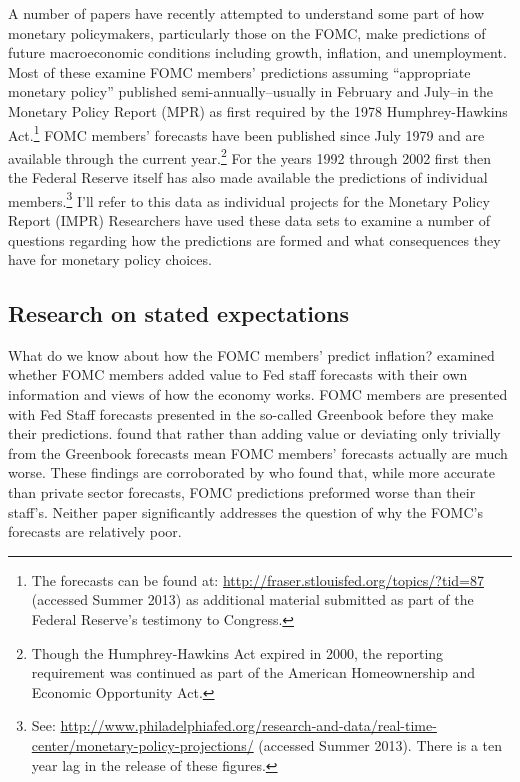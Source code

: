 \documentclass[a4paper]{article}\usepackage[]{graphicx}\usepackage[]{color}
\begin{document}
A number of papers have recently attempted to understand some part of how monetary policymakers, particularly those on the FOMC, make predictions of future macroeconomic conditions including growth, inflation, and unemployment. Most of these examine FOMC members' predictions assuming ``appropriate monetary policy'' published semi-annually--usually in February and July--in the Monetary Policy Report (MPR) as first required by the 1978  Humphrey-Hawkins Act.\footnote{The forecasts can be found at: \url{http://fraser.stlouisfed.org/topics/?tid=87} (accessed Summer 2013) as additional material submitted as part of the Federal Reserve's testimony to Congress.} FOMC members' forecasts have been published since July 1979 and are available through the current year.\footnote{Though the Humphrey-Hawkins Act expired in 2000, the reporting requirement was continued as part of the American Homeownership and Economic Opportunity Act.} For the years 1992 through 2002 first \cite{Romer2010Data} then the Federal Reserve itself has also made available the predictions of individual members.\footnote{See: \url{http://www.philadelphiafed.org/research-and-data/real-time-center/monetary-policy-projections/} (accessed Summer 2013). There is a ten year lag in the release of these figures.} I'll refer to this data as individual projects for the Monetary Policy Report (IMPR) Researchers have used these data sets to examine a number of questions regarding how the predictions are formed and what consequences they have for monetary policy choices. 

\subsection{Research on stated expectations}

What do we know about how the FOMC members' predict inflation? \cite{RomerRomer2008} examined whether FOMC members added value to Fed staff forecasts with their own information and views of how the economy works. FOMC members are presented with Fed Staff forecasts presented in the so-called Greenbook before they make their predictions. \cite{RomerRomer2008} found that rather than adding value or deviating only trivially from the Greenbook forecasts mean FOMC members' forecasts actually are much worse. These findings are corroborated by \cite{Gavin2003} who found that, while more accurate than private sector forecasts, FOMC predictions preformed worse than their staff's. Neither paper significantly addresses the question of why the FOMC's forecasts are relatively poor. 
\end{document}
